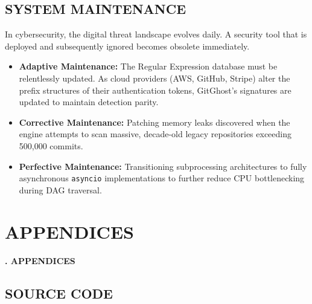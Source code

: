 \documentclass[12pt, a4paper, oneside]{report}
\begin{document}
\section{SYSTEM MAINTENANCE}
In cybersecurity, the digital threat landscape evolves daily. A security tool that is deployed and subsequently ignored becomes obsolete immediately.
\begin{itemize}
    \item \textbf{Adaptive Maintenance:} The Regular Expression database must be relentlessly updated. As cloud providers (AWS, GitHub, Stripe) alter the prefix structures of their authentication tokens, GitGhost’s signatures are updated to maintain detection parity.
    \item \textbf{Corrective Maintenance:} Patching memory leaks discovered when the engine attempts to scan massive, decade-old legacy repositories exceeding 500,000 commits.
    \item \textbf{Perfective Maintenance:} Transitioning subprocessing architectures to fully asynchronous \texttt{asyncio} implementations to further reduce CPU bottlenecking during DAG traversal.
\end{itemize}

\chapter{APPENDICES}
\begin{center}
    {\Large \textbf{\thechapter. APPENDICES} \par}
\end{center}
\vspace{1cm}

\section{SOURCE CODE}
\end{document}
